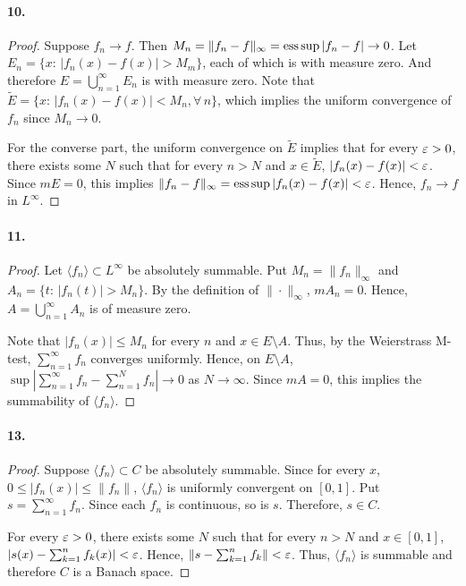   \paragraph{10.}
  \begin{proof}
    Suppose $f_n\to f$. Then $M_n=\|f_n-f\|_\infty=\operatorname*{ess\,sup}|f_n-f|\to 0$. Let
    $E_n=\{x:\,|f_n(x)-f(x)|>M_m\}$, each of which is with measure zero. And
    therefore $E=\bigcup_{n=1}^\infty E_n$ is with measure zero. Note that 
    $\tilde{E}=\{x:\,|f_n(x)-f(x)|<M_n,\forall\,n\}$, which implies the uniform
    convergence of $f_n$ since $M_n\to 0$.\par
    For the converse part, the uniform convergence on $\tilde{E}$ implies that
    for every $\varepsilon>0$, there exists some $N$ such that for every $n>N$ and $x
    \in\tilde{E}$, $|f_n(x)-f(x)|<\varepsilon$. Since $mE=0$, this implies $\|f_n-f
    \|_\infty=\operatorname*{ess\,sup}|f_n(x)-f(x)|<\varepsilon$. Hence, $f_n\to f$ in $L^\infty$.
  \end{proof}

  \paragraph{11.}
  \begin{proof}
    Let $\langle f_n\rangle\subset L^\infty$ be absolutely summable. Put $M_n=
    \|f_n\|_\infty$ and $A_n=\{t:\,|f_n(t)|>M_n\}$. By the definition of $\|
    \cdot\|_\infty$, $mA_n=0$. Hence, $A=\bigcup_{n=1}^\infty A_n$ is of measure
    zero. \par
    Note that $|f_n(x)|\le M_n$ for every $n$ and $x\in E\setminus A$. Thus, by
    the Weierstrass M-test, $\sum_{n=1}^\infty f_n$ converges uniformly. Hence,
    on $E\setminus A$, $\sup|\sum_{n=1}^\infty f_n - \sum_{n=1}^N f_n|\to 0$ as
    $N\to\infty$. Since $mA=0$, this implies the summability of $\langle f_n
    \rangle$.
  \end{proof}

  \paragraph{13.}
  \begin{proof}
    Suppose $\langle f_n\rangle\subset C$ be absolutely summable. Since for
    every $x$, $0\le|f_n(x)|\le\|f_n\|$, $\langle f_n\rangle$ is uniformly
    convergent on $[0,1]$. Put $s=\sum_{n=1}^\infty f_n$. Since each $f_n$ is 
    continuous, so is $s$. Therefore, $s\in C$. \par
    For every $\varepsilon>0$, there exists some $N$ such that for every $n>N$ and $x
    \in[0,1]$, $\left|s(x)-\sum_{k=1}^nf_k(x)\right|<\varepsilon$. Hence, $\|s-
    \sum_{k=1}^nf_k\|<\varepsilon$. Thus, $\langle f_n\rangle$ is summable and
    therefore $C$ is a Banach space.
  \end{proof}

